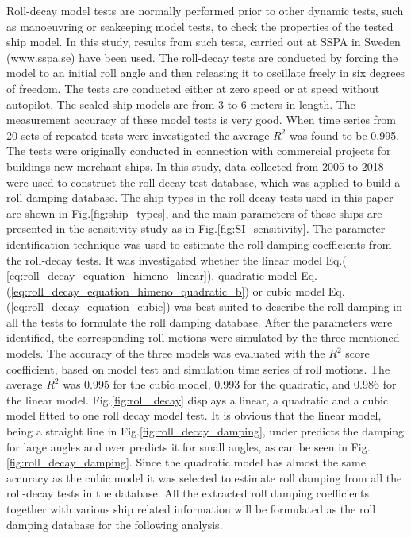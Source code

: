 Roll-decay model tests are normally performed prior to other dynamic tests, such as manoeuvring or seakeeping model tests, to check the properties of the tested ship model. In this study, results from such tests, carried out at SSPA in Sweden (www.sspa.se) have been used. The roll-decay tests are conducted by forcing the model to an initial roll angle and then releasing it to oscillate freely in six degrees of freedom. The tests are conducted either  at zero speed or at speed without autopilot. The scaled ship models are from 3 to 6 meters in  length. The measurement accuracy of these model tests is very good. When time series from 20 sets of repeated tests were investigated the average $R^2$ was found to be 0.995. The tests were originally conducted in connection with commercial projects for buildings new merchant ships. In this study, data collected from 2005 to 2018 were used to construct the roll-decay test database, which was applied to build a roll damping database. The ship types in the roll-decay tests used in this paper are  shown in Fig.\ref{fig:ship_types}, and the main parameters of these ships are presented in the sensitivity study as in Fig.\ref{fig:SI_sensitivity}. 
The parameter identification technique was used to estimate the roll damping coefficients from the roll-decay tests. It was investigated whether the linear model Eq.( \ref{eq:roll_decay_equation_himeno_linear}), quadratic model Eq.(\ref{eq:roll_decay_equation_himeno_quadratic_b}) or cubic model Eq.(\ref{eq:roll_decay_equation_cubic}) was best suited to describe the roll damping in all the tests to formulate the roll damping database. After the parameters were identified, the corresponding roll motions were simulated by the three mentioned models. The accuracy of the three models was evaluated with the $R^2$ score coefficient, based on model test and simulation time series of roll motions.
The average $R^2$ was 0.995 for the cubic model, 0.993 for the quadratic, and 0.986 for the linear model. Fig.\ref{fig:roll_decay} displays a linear, a quadratic and a cubic model fitted to one roll decay model test. It is obvious that the linear model, being a straight line in Fig.\ref{fig:roll_decay_damping}, under predicts the damping for large angles and over predicts it for small angles, as can be seen in Fig.\ref{fig:roll_decay_damping}. Since the quadratic model has almost the same accuracy as the cubic model it was selected to estimate roll damping from all the roll-decay tests in the database. All the extracted roll damping coefficients together with various ship related information will be formulated as the roll damping database for the following analysis.

